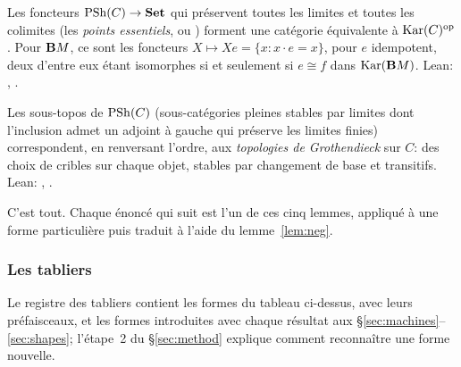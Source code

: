 \begin{bridge}\label{br:pts}
Les foncteurs $\mathrm{PSh}(C)\to\mathbf{Set}$ qui préservent toutes les limites et toutes les colimites (les \emph{points essentiels}, ou ) forment une catégorie équivalente à $\operatorname{Kar}(C)^{\mathrm{op}}$. Pour $\mathbf{B} M$, ce sont les foncteurs $X\mapsto Xe = \{x : x\cdot e = x\}$, pour $e$ idempotent, deux d'entre eux étant isomorphes si et seulement si $e\cong f$ dans $\operatorname{Kar}(\mathbf{B} M)$. Lean: , .
\end{bridge}

\begin{bridge}\label{br:sub}
Les sous-topos de $\mathrm{PSh}(C)$ (sous-catégories pleines stables par limites dont l'inclusion admet un adjoint à gauche qui préserve les limites finies) correspondent, en renversant l'ordre, aux \emph{topologies de Grothendieck} sur $C$: des choix de cribles  sur chaque objet, stables par changement de base et transitifs. Lean: , .
\end{bridge}

C'est tout. Chaque énoncé qui suit est l'un de ces cinq lemmes, appliqué à une forme particulière puis traduit à l'aide du lemme~\ref{lem:neg}.

\subsubsection{Les tabliers}

Le registre des tabliers contient les formes du tableau ci-dessus, avec leurs préfaisceaux, et les formes introduites avec chaque résultat aux \S\ref{sec:machines}--\ref{sec:shapes}; l'étape~2 du \S\ref{sec:method} explique comment reconnaître une forme nouvelle.
